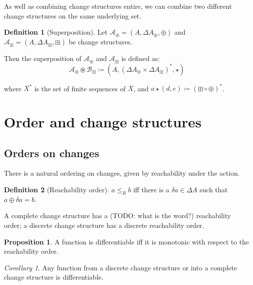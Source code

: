 \documentclass[english]{article}
\theoremstyle{plain}
\theoremstyle{definition}
\newtheorem{prop}[thm]{Proposition}
\theoremstyle{remark}
\theoremstyle{remark}
\newtheorem{corollary}[thm]{Corollary}
\theoremstyle{remark}
\theoremstyle{definition}
\newtheorem{defn}{Definition}
\newcommand{\defeq}{\coloneqq}
\newcommand{\cplus}{\oplus}
\newcommand{\cpluss}{\boxplus}
\newcommand{\cstruct}[3]{(#1,#2,#3)}
\newcommand{\changes}[1]{\Delta #1}
\newcommand{\change}[1]{\delta #1}
\newcommand{\superpose}{\circledast}
\newcommand{\reaches}{\leq_R}
\begin{document}
As well as combining change structures entire, we can combine two different
change structures on the same underlying set.

\begin{defn}[Superposition]
  Let $\mathcal{A}_\cplus = \cstruct{A}{\changes{A}_\cplus}{\cplus}$ and $\mathcal{A}_\cpluss =
  \cstruct{A}{\changes{A}_\cpluss}{\cpluss}$ be change structures.

  Then the superposition of $\mathcal{A}_\cplus$ and $\mathcal{A}_\cpluss$ is defined as:
  $$\mathcal{A}_\cplus \superpose \mathcal{B}_\cpluss \defeq \cstruct{A}{
    (\changes{A}_\cplus \times \changes{A}_\cpluss)^\ast}{\star}$$

  where $X^\ast$ is the set of finite sequences of $X$, and $a \star (d, e)
  \defeq (\cpluss \circ \cplus)^\ast$.
 
\end{defn}

\section{Order and change structures}

\subsection{Orders on changes}

There is a natural ordering on changes, given by reachability under the action.

\begin{defn}[Reachability order]
  $a \reaches b$ iff there is a $\change{a} \in \changes{A}$ such that $a \cplus
  \change{a} = b$.
\end{defn}

A complete change structure has a (TODO: what is the word?) reachability order;
a discrete change structure has a discrete reachability order.

\begin{prop}
  A function is differentiable iff it is monotonic with respect to the
  reachability order.
\end{prop}

\begin{corollary}
  Any function from a discrete change structure or into a complete change
  structure is differentiable.
\end{corollary}

\nocite{*}


\end{document}
